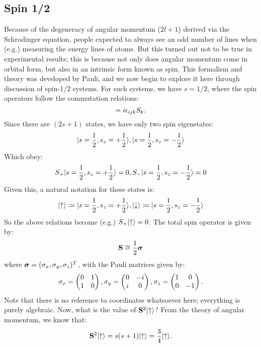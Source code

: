 \subsection{Spin 1/2}
Because of the degeneracy of angular momentum ($2l+1$) derived via the Schrodinger equation, people expected to always see an odd number of lines when (e.g.) measuring the energy lines of atoms. But this turned out not to be true in experimental results; this is because not only does angular momentum come in orbital form, but also in an intrinsic form known as spin. This formalism and theory was developed by Pauli, and we now begin to explore it here through discussion of spin-1/2 systems. For such systems, we have $s = 1/2$, where the spin operators follow the commutation relations:
\begin{equation}
    [S_i, S_j] = i\e_{ijk}S_k.
\end{equation}
Since there are $(2s+1)$ states, we have only two spin eigenstates:
\begin{equation}
    \lvert s = \frac{1}{2}, s_z = +\frac{1}{2} \rangle, \lvert s = \frac{1}{2}, s_z = -\frac{1}{2} \rangle
\end{equation}
Which obey:
\begin{equation}
    S_+\lvert s = \frac{1}{2}, s_z = +\frac{1}{2} \rangle = 0,  S_-\lvert s = \frac{1}{2}, s_z = -\frac{1}{2} \rangle = 0
\end{equation}
Given this, a natural notation for these states is:
\begin{equation}
    \lvert \uparrow \rangle \coloneqq \lvert s = \frac{1}{2}, s_z = +\frac{1}{2} \rangle, \lvert \downarrow \rangle \coloneqq \lvert s = \frac{1}{2}, s_z = -\frac{1}{2} \rangle
\end{equation}
So the above relations become (e.g.) $S_+\lvert \uparrow \rangle = 0$. The total spin operator is given by:
\begin{equation}
    \mathbf{S} \cong \frac{1}{2}\mbox{\boldmath$ \sigma $}
\end{equation}
where $\mbox{\boldmath$ \sigma $} = (\sigma_x, \sigma_y, \sigma_z)^T$, with the Pauli matrices given by:
\begin{equation}
    \sigma_x = \begin{pmatrix} 0 & 1 \\ 1 & 0 \end{pmatrix}, \sigma_y = \begin{pmatrix} 0 & -i \\ i & 0 \end{pmatrix}, \sigma_z = \begin{pmatrix} 1 & 0 \\ 0 & -1 \end{pmatrix}.
\end{equation}
Note that there is no reference to coordinates whatsoever here; everything is purely algebraic. Now, what is the value of $\mathbf{S}^2\lvert \uparrow \rangle$? From the theory of angular momentum, we know that:
\begin{equation}
    \mathbf{S}^2\lvert \uparrow \rangle = s(s+1)\lvert \uparrow \rangle = \frac{3}{4}\lvert \uparrow \rangle.
\end{equation}
